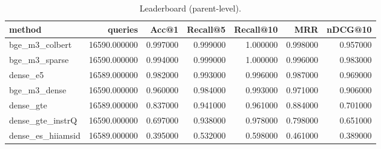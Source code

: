 \begin{table}
\caption{Leaderboard (parent-level).}
\label{tab:lb_parent}
\begin{tabular}{lrrrrrr}
\toprule
method & queries & Acc@1 & Recall@5 & Recall@10 & MRR & nDCG@10 \\
\midrule
bge_m3_colbert & 16590.000000 & 0.997000 & 0.999000 & 1.000000 & 0.998000 & 0.957000 \\
bge_m3_sparse & 16590.000000 & 0.994000 & 0.999000 & 1.000000 & 0.996000 & 0.983000 \\
dense_e5 & 16589.000000 & 0.982000 & 0.993000 & 0.996000 & 0.987000 & 0.969000 \\
bge_m3_dense & 16590.000000 & 0.960000 & 0.984000 & 0.993000 & 0.971000 & 0.906000 \\
dense_gte & 16589.000000 & 0.837000 & 0.941000 & 0.961000 & 0.884000 & 0.701000 \\
dense_gte_instrQ & 16590.000000 & 0.697000 & 0.938000 & 0.978000 & 0.798000 & 0.651000 \\
dense_es_hiiamsid & 16589.000000 & 0.395000 & 0.532000 & 0.598000 & 0.461000 & 0.389000 \\
\bottomrule
\end{tabular}
\end{table}

